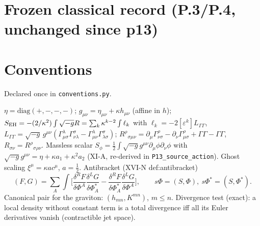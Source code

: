 \section{Frozen classical record (P.3/P.4, unchanged since p13)}\label{sec:frozen-classical}
\section{Conventions}
\noindent Declared once in \texttt{conventions.py}.\par\smallskip
$\eta=\mathrm{diag}(+,-,-,-)$; $g_{\mu\nu}=\eta_{\mu\nu}+\kappa h_{\mu\nu}$ (affine in $h$);
$S_{\rm EH}=-(2/\kappa^2)\int\sqrt{-g}R=\sum_k\kappa^{k-2}\int\ell_k$ with $\ell_k=-2[\varepsilon^k]L_{\Gamma\Gamma}$,
$L_{\Gamma\Gamma}=\sqrt{-g}\,g^{\mu\nu}(\Gamma^\lambda_{\mu\sigma}\Gamma^\sigma_{\nu\lambda}-\Gamma^\lambda_{\mu\nu}\Gamma^\sigma_{\lambda\sigma})$;
$R^\rho{}_{\sigma\mu\nu}=\partial_\mu\Gamma^\rho_{\nu\sigma}-\partial_\nu\Gamma^\rho_{\mu\sigma}+\Gamma\Gamma-\Gamma\Gamma$,
$R_{\sigma\nu}=R^\rho{}_{\sigma\rho\nu}$.
Massless scalar $S_\phi=\tfrac12\int\sqrt{-g}g^{\mu\nu}\partial_\mu\phi\partial_\nu\phi$ with
$\sqrt{-g}g^{\mu\nu}=\eta+\kappa a_1+\kappa^2a_2$ (XI-A, re-derived in \texttt{P13\_source\_action}).
Ghost scaling $\xi^\mu=\kappa a c^\mu$, $a=\tfrac12$. Antibracket (XVI-N def:antibracket)
\[(F,G)=\sum_A\int\Big[\frac{\delta^RF}{\delta\Phi^A}\frac{\delta^LG}{\delta\Phi^*_A}-\frac{\delta^RF}{\delta\Phi^*_A}\frac{\delta^LG}{\delta\Phi^A}\Big],
\qquad s\Phi=(S,\Phi),\ s\Phi^*=(S,\Phi^*).\]
Canonical pair for the graviton: $(h_{mn},K^{mn})$, $m\le n$. Divergence test (exact): a local density without
constant term is a total divergence iff all its Euler derivatives vanish (contractible jet space).


